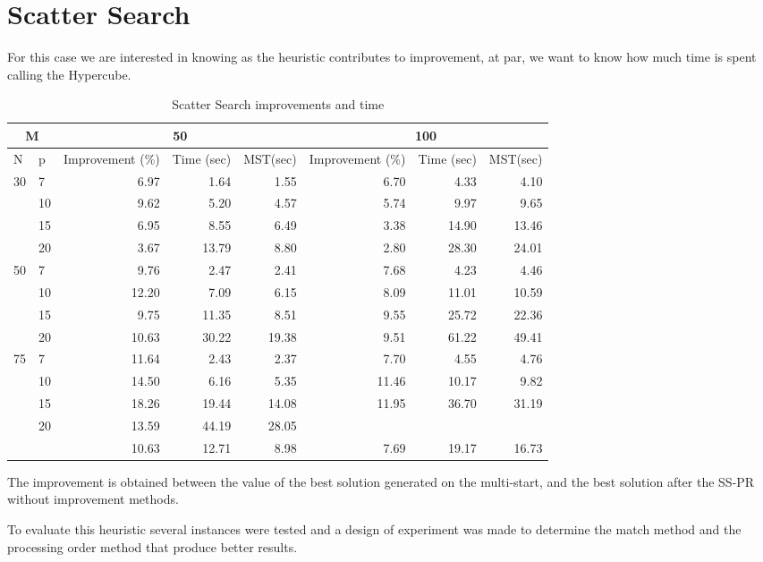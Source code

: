 \section{Scatter Search}
For this case
we are interested in knowing
as the heuristic contributes to improvement,
at par,
we want to know
how much time is spent
calling the Hypercube.

\begin{sidewaystable}
  \centering
  \begin{tabular}{|l|l|r|r|r|r|r|r|}
    \hline
    \multicolumn{2}{|c|}{M}
    & \multicolumn{3}{|c|}{50}
    & \multicolumn{3}{|c|}{100} \\ \hline 
    N & p & Improvement (\%) & Time (sec) & MST(sec)
    & Improvement (\%) & Time (sec) & MST(sec) \\ \hline
    \multirow{4}{*}{30}
    & 7 & 6.97 & 1.64 & 1.55
    & 6.70 & 4.33 & 4.10 \\
    & 10 & 9.62 & 5.20 & 4.57
    & 5.74 & 9.97 & 9.65 \\
    & 15 & 6.95 & 8.55 & 6.49
    & 3.38 & 14.90 & 13.46 \\
    & 20 & 3.67 & 13.79 & 8.80
    & 2.80 & 28.30 & 24.01 \\ \hline
    \multirow{4}{*}{50}
    & 7 & 9.76 & 2.47 & 2.41
    & 7.68 & 4.23 & 4.46 \\
    & 10 & 12.20 & 7.09 & 6.15
    & 8.09 & 11.01 & 10.59 \\
    & 15 & 9.75 & 11.35 & 8.51
    & 9.55 & 25.72 & 22.36 \\
    & 20 & 10.63 & 30.22 & 19.38
    & 9.51 & 61.22 & 49.41 \\ \hline
    \multirow{4}{*}{75}
    & 7 & 11.64 & 2.43 & 2.37
    & 7.70 & 4.55 & 4.76 \\
    & 10 & 14.50 & 6.16 & 5.35
    & 11.46 & 10.17 & 9.82 \\
    & 15 & 18.26 & 19.44 & 14.08
    & 11.95 & 36.70 & 31.19 \\
    & 20 & 13.59 & 44.19 & 28.05
    & & & \\ \hline
    & & 10.63 & 12.71 & 8.98
    & 7.69 & 19.17 & 16.73 \\
    \hline
  \end{tabular}
  \caption[Scatter Search]{Scatter Search improvements and time}
  \label{tab:SS}
\end{sidewaystable}
The improvement
is obtained
between the value of the best solution
generated on the multi-start,
and the best solution after the SS-PR
without improvement methods.

To evaluate this heuristic
several instances were tested
and
a design of experiment was made
to determine
the match method
and the processing order method
that produce better results.

